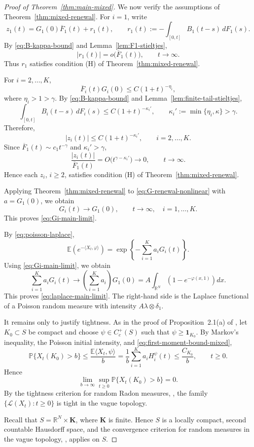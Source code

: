\documentclass[reqno,final,11pt]{amsart}
\newcommand{\R}{\mathbb R}
\newcommand{\E}{\mathbb E}
\newcommand{\Pbb}{\mathbb P}
\newcommand{\Kk}{\mathbf K}
\newcommand{\ip}[2]{\langle #1,#2\rangle}
\theoremstyle{plain}
\theoremstyle{definition}
\theoremstyle{remark}
\numberwithin{equation}{section}
\begin{document}
\begin{proof}[Proof of Theorem~\ref{thm:main-mixed}]
We now verify the assumptions of Theorem~\ref{thm:mixed-renewal}. For \(i=1\), write
\[
  z_1(t)=G_1(0)\overline F_1(t)+r_1(t),
  \qquad
  r_1(t):=-\int_{[0,t]}B_1(t-s)\,dF_1(s).
\]
By \eqref{eq:B-kappa-bound} and Lemma~\ref{lem:F1-stieltjes},
\[
  |r_1(t)|=o\bigl(\overline F_1(t)\bigr),
  \qquad t\to\infty.
\]
Thus \(r_1\) satisfies condition \textup{(H)} of Theorem~\ref{thm:mixed-renewal}.

For \(i=2,\dots,K\),
\[
  \overline F_i(t)G_i(0)\le C(1+t)^{-\eta_i},
\]
where \(\eta_i>1>\gamma\). By \eqref{eq:B-kappa-bound} and Lemma~\ref{lem:finite-tail-stieltjes},
\[
  \int_{[0,t]}B_i(t-s)\,dF_i(s)
  \le C(1+t)^{-\kappa_i'},
  \qquad
  \kappa_i':=\min\{\eta_i,\kappa\}>\gamma.
\]
Therefore,
\[
  |z_i(t)|\le C(1+t)^{-\kappa_i'},
  \qquad i=2,\dots,K.
\]
Since \(\overline F_1(t)\sim c_1t^{-\gamma}\) and \(\kappa_i'>\gamma\),
\[
  \frac{|z_i(t)|}{\overline F_1(t)}
  =O\bigl(t^{\gamma-\kappa_i'}\bigr)
  \longrightarrow0,
  \qquad t\to\infty.
\]
Hence each \(z_i\), \(i\ge2\), satisfies condition \textup{(H)} of Theorem~\ref{thm:mixed-renewal}.

Applying Theorem~\ref{thm:mixed-renewal} to \eqref{eq:G-renewal-nonlinear} with \(a=G_1(0)\), we obtain
\[
  G_i(t)\longrightarrow G_1(0),
  \qquad t\to\infty,\quad i=1,\dots,K.
\]
This proves \eqref{eq:Gi-main-limit}.

By \eqref{eq:poisson-laplace},
\[
  \E\left(e^{-\ip{X_t}{\varphi}}\right)
  =
  \exp\left\{-\sum_{i=1}^K a_iG_i(t)\right\}.
\]
Using \eqref{eq:Gi-main-limit}, we obtain
\[
  \sum_{i=1}^K a_iG_i(t)
  \longrightarrow
  \left(\sum_{i=1}^K a_i\right)G_1(0)
  =
  A\int_{\R^N}\left(1-e^{-\varphi(x,1)}\right)dx.
\]
This proves \eqref{eq:laplace-main-limit}. The right-hand side is the Laplace functional of a Poisson random measure with intensity \(A\lambda\otimes\delta_1\).

It remains only to justify tightness. As in the proof of
Proposition~2.1(a) of \cite{KLRFiniteMean}, let \(K_0\subset S\) be compact
and choose \(\psi\in C_c^+(S)\) such that \(\psi\ge\mathbf1_{K_0}\).
By Markov's inequality, the Poisson initial intensity, and
\eqref{eq:first-moment-bound-mixed},
\[
  \Pbb\{X_t(K_0)>b\}
  \le \frac{\E\ip{X_t}{\psi}}{b}
  =\frac{1}{b}\sum_{i=1}^Ka_iH_i^\psi(t)
  \le\frac{C_{K_0}}{b},
  \qquad t\ge0.
\]
Hence
\[
  \lim_{b\to\infty}\sup_{t\ge0}\Pbb\{X_t(K_0)>b\}=0.
\]
By the tightness criterion for random Radon measures,
\cite[Lemma~4.5]{Olav}, the family
\(\{\mathcal L(X_t):t\ge0\}\) is tight in the vague topology.

Recall that \(S=\R^N\times\Kk\), where \(\Kk\) is finite. Hence \(S\) is a
locally compact, second countable Hausdorff space, and the convergence
criterion for random measures in the vague topology,
\cite[Theorem~4.2]{Olav}, applies on \(S\).


\end{proof}
\end{document}

